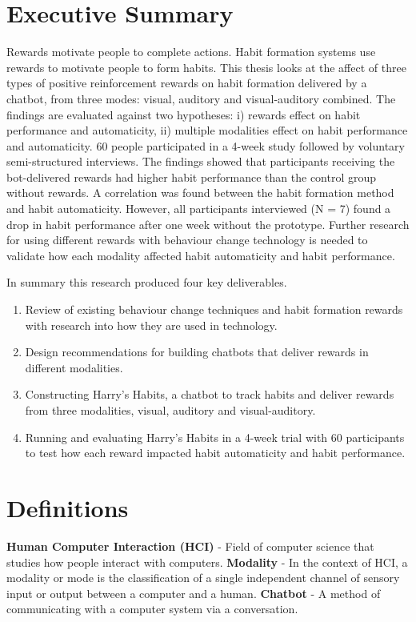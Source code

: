 
\section*{Executive Summary}
Rewards motivate people to complete actions. Habit formation systems use rewards to motivate people to form habits. This thesis looks at the affect of three types of positive reinforcement rewards on habit formation delivered by a chatbot, from three modes: visual, auditory and visual-auditory combined. The findings are evaluated against two hypotheses: i) rewards effect on habit performance and automaticity, ii) multiple modalities effect on habit performance and automaticity. 60 people participated in a 4-week study followed by voluntary semi-structured interviews. The findings showed that participants receiving the bot-delivered rewards had higher habit performance than the control group without rewards. A correlation was found between the habit formation method and habit automaticity. However, all participants interviewed (N = 7) found a drop in habit performance after one week without the prototype. Further research for using different rewards with behaviour change technology is needed to validate how each modality affected habit automaticity and habit performance.

In summary this research produced four key deliverables.

\begin{enumerate}
  \item Review of existing behaviour change techniques and habit formation rewards with research into how they are used in technology.
  \item Design recommendations for building chatbots that deliver rewards in different modalities.
  \item Constructing Harry's Habits, a chatbot to track habits and deliver rewards from three modalities, visual, auditory and visual-auditory.
  \item Running and evaluating Harry's Habits in a 4-week trial with 60 participants to test how each reward impacted habit automaticity and habit performance.
\end{enumerate}

\newpage




\section*{Definitions}

\textbf{Human Computer Interaction (HCI)} - Field of computer science that studies how people interact with computers.\newline
\newline
\textbf{Modality} - In the context of HCI, a modality or mode is the classification of a single independent channel of sensory input or output between a computer and a human.\newline
\newline
\textbf{Chatbot} - A method of communicating with a computer system via a conversation.

\newpage
